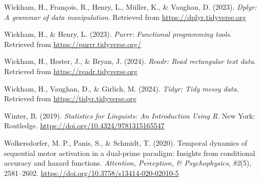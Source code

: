 \documentclass[
  man, donotrepeattitle,floatsintext]{apa6}
\newlength{\cslhangindent}
\newenvironment{CSLReferences}[2] %
 {\begin{list}{}{%
  \setlength{\itemindent}{0pt}
  \setlength{\leftmargin}{0pt}
  \setlength{\parsep}{0pt}
  \ifodd #1
   \setlength{\leftmargin}{\cslhangindent}
   \setlength{\itemindent}{-1\cslhangindent}
  \fi
  \setlength{\itemsep}{#2\baselineskip}}}
 {\end{list}}
\begin{document}
\begin{CSLReferences}{1}{0}
Wickham, H., François, R., Henry, L., Müller, K., \& Vaughan, D. (2023). \emph{Dplyr: A grammar of data manipulation}. Retrieved from \url{https://dplyr.tidyverse.org}

Wickham, H., \& Henry, L. (2023). \emph{Purrr: Functional programming tools}. Retrieved from \url{https://purrr.tidyverse.org/}

Wickham, H., Hester, J., \& Bryan, J. (2024). \emph{Readr: Read rectangular text data}. Retrieved from \url{https://readr.tidyverse.org}

Wickham, H., Vaughan, D., \& Girlich, M. (2024). \emph{Tidyr: Tidy messy data}. Retrieved from \url{https://tidyr.tidyverse.org}

Winter, B. (2019). \emph{Statistics for {Linguists}: {An Introduction Using R}}. New York: Routledge. \url{https://doi.org/10.4324/9781315165547}

Wolkersdorfer, M. P., Panis, S., \& Schmidt, T. (2020). Temporal dynamics of sequential motor activation in a dual-prime paradigm: {Insights} from conditional accuracy and hazard functions. \emph{Attention, Perception, \& Psychophysics}, \emph{82}(5), 2581--2602. \url{https://doi.org/10.3758/s13414-020-02010-5}

\end{CSLReferences}
\end{document}
